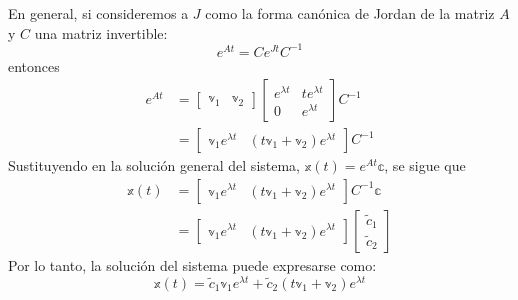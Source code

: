 En general, si consideremos a $J$ como la forma canónica de Jordan de la matriz $A$ y $C$ una matriz invertible:
$$e^{At} = Ce^{Jt}C^{-1}$$
entonces
\begin{align*}
    e^{At} & = \begin{bmatrix} \mathbb{v}_1 & \mathbb{v}_2 \end{bmatrix} \begin{bmatrix} e^{\lambda t} & te^{\lambda t} \\ 0 & e^{\lambda t} \end{bmatrix} C^{-1} \\
    & = \begin{bmatrix} \mathbb{v}_1 e^{\lambda t} & (t\mathbb{v}_1 + \mathbb{v}_2)e^{\lambda t} \end{bmatrix} C^{-1}
\end{align*}
Sustituyendo en la solución general del sistema, $\mathbb{x}(t) = e^{At} \mathbb{c}$, se sigue que
\begin{align*}
    \mathbb{x}(t) & = \begin{bmatrix} \mathbb{v}_1 e^{\lambda t} & (t\mathbb{v}_1 + \mathbb{v}_2)e^{\lambda t} \end{bmatrix} C^{-1} \mathbb{c} \\
    & = \begin{bmatrix} \mathbb{v}_1 e^{\lambda t} & (t\mathbb{v}_1 + \mathbb{v}_2)e^{\lambda t} \end{bmatrix} \begin{bmatrix} \tilde{c}_1 \\ \tilde{c}_2 \end{bmatrix}
\end{align*}
Por lo tanto, la solución del sistema puede expresarse como:
$$\mathbb{x}(t) = \tilde{c}_1 \mathbb{v}_1 e^{\lambda t} + \tilde{c}_2(t\mathbb{v}_1 + \mathbb{v}_2)e^{\lambda t}$$

